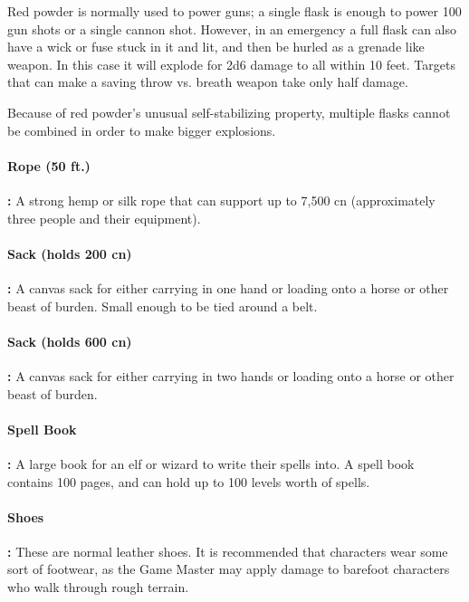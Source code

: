 \begin{multicols*}{2}
Red powder is normally used to power guns; a single flask is enough to power 100 gun shots or a single cannon shot. However, in an emergency a full flask can also have a wick or fuse stuck in it and lit, and then be hurled as a grenade like weapon. In this case it will explode for 2d6 damage to all within 10 feet. Targets that can make a saving throw vs. breath weapon take only half damage.

Because of red powder’s unusual self-stabilizing property, multiple flasks cannot be combined in order to make bigger explosions.

\paragraph{Rope (50 ft.)}\textbf{:} A strong hemp or silk rope that can support up to 7,500 cn (approximately three people and their equipment).

\paragraph{Sack (holds 200 cn)}\textbf{:} A canvas sack for either carrying in one hand or loading onto a horse or other beast of burden. Small enough to be tied around a belt.

\paragraph{Sack (holds 600 cn)}\textbf{:} A canvas sack for either carrying in two hands or loading onto a horse or other beast of burden.

\paragraph{Spell Book}\textbf{:} A large book for an elf or wizard to write their spells into. A spell book contains 100 pages, and can hold up to 100 levels worth of spells.

\paragraph{Shoes}\textbf{:} These are normal leather shoes. It is recommended that characters wear some sort of footwear, as the Game Master may apply damage to barefoot characters who walk through rough terrain.


\end{multicols*}

